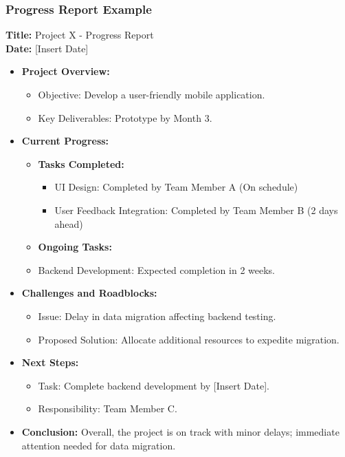 \documentclass[aspectratio=169]{beamer}
\begin{document}
\begin{frame}[fragile]
    \frametitle{Progress Report Example}
    \textbf{Title:} Project X - Progress Report \\
    \textbf{Date:} [Insert Date] \\

    \begin{itemize}
        \item \textbf{Project Overview:}
            \begin{itemize}
                \item Objective: Develop a user-friendly mobile application.
                \item Key Deliverables: Prototype by Month 3.
            \end{itemize}

        \item \textbf{Current Progress:}
            \begin{itemize}
                \item \textbf{Tasks Completed:}
                    \begin{itemize}
                        \item UI Design: Completed by Team Member A (On schedule)
                        \item User Feedback Integration: Completed by Team Member B (2 days ahead)
                    \end{itemize}
                \item \textbf{Ongoing Tasks:}
                    \item Backend Development: Expected completion in 2 weeks.
            \end{itemize}
        
        \item \textbf{Challenges and Roadblocks:}
            \begin{itemize}
                \item Issue: Delay in data migration affecting backend testing.
                \item Proposed Solution: Allocate additional resources to expedite migration.
            \end{itemize}
        
        \item \textbf{Next Steps:}
            \begin{itemize}
                \item Task: Complete backend development by [Insert Date].
                \item Responsibility: Team Member C.
            \end{itemize}
        
        \item \textbf{Conclusion:} Overall, the project is on track with minor delays; immediate attention needed for data migration.
    \end{itemize}
\end{frame}
\end{document}
